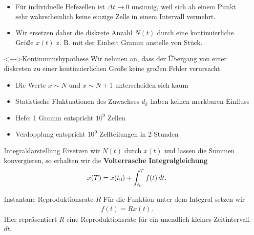 \begin{frame}
  \begin{itemize}
  \item<+-> Für individuelle Hefezellen ist $\Delta t \to 0$ unsinnig,
    weil sich ab einem Punkt sehr wahrscheinlich keine einzige Zelle
    in einem Intervall vermehrt.
    \item<+-> Wir ersetzen daher die diskrete Anzahl $N(t)$ durch eine
    kontinuierliche Größe $x(t)$ z. B. mit der Einheit Gramm anstelle
    von Stück.
  \end{itemize}
  \begin{block}<+->{Kontinuumshypothese} Wir nehmen an, dass der
    Übergang von einer diskreten zu einer kontinuierlichen Größe keine
    großen Fehler verursacht.
    \begin{itemize}
    \item Die Werte $x \sim N$ und $x\sim N+1$ unterscheiden sich kaum
    \item Statistische Fluktuationen des Zuwachses $d_k$ haben keinen
      merkbaren Einfluss
    \end{itemize}
  \end{block}

  \begin{itemize}
  \item<+-> Hefe: 1 Gramm entspricht $10^9$ Zellen
  \item<+-> Verdopplung entspricht $10^9$ Zellteilungen in 2 Stunden
  \end{itemize}
\end{frame}

\begin{frame}{Integraldarstellung}
  Ersetzen wir $N(t)$ durch $x(t)$ und lassen die Summen konvergieren, so erhalten wir die \textbf{Volterrasche Integralgleichung}
    \begin{gather*}
      x(T) = x(t_0) + \int_{t_0}^T f(t) \,dt.      
    \end{gather*}
  \begin{block}{Instantane Reproduktionsrate $R$}
    Für die Funktion unter dem Integral setzen wir
    \begin{gather*}
      f(t) = R x(t).
    \end{gather*}
    Hier repräsentiert $R$ eine Reproduktionsrate für ein unendlich kleines Zeitintervall $dt$.
  \end{block}
\end{frame}

